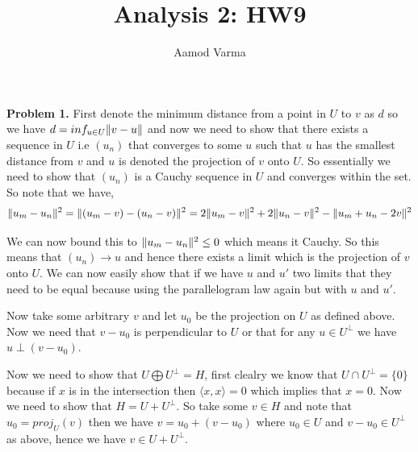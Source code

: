 \documentclass[a4paper]{article}
\title{Analysis 2: HW9}
\author{Aamod Varma}
\DeclarePairedDelimiter{\norm}{\lVert}{\rVert}
\begin{document}
\maketitle
\textbf{Problem 1.}
First denote the minimum distance from a point in $U$ to $v$ as $d$ so we have $d = inf_{u \in U} \norm{v - u}$ and now we need to show that there exists a sequence in $U$ i.e $(u_n)$ that converges to some $u$ such that $u$ has the smallest distance from $v$ and $u$ is denoted the projection of $v$ onto $U$. So essentially we  need to show that $(u_n)$ is a Cauchy sequence in $U$ and converges within the set. So note that we have, 
\[
  \norm{u_m - u_n}^2 = \norm{(u_m - v) - (u_n - v)}^2 = 2 \norm{u_m - v}^2 + 2 \norm{u_n - v}^2 - \norm{u_m + u_n - 2v}^2
\]

We can now bound this to $\norm{u_m - u_n}^2 \le 0$ which means it Cauchy. So this means that $(u_n) \to u$ and hence there exists a limit which is the projection of $v$ onto $U$. We can now easily show that if we have $u$ and $u'$ two limits that they need to be equal because using the parallelogram law again but with $u$ and $u'$.

\vspace{1em}
Now take some arbitrary $v$ and let $u_{0}$ be the projection on $U$ as defined above. Now we need that $v - u_{0}$ is perpendicular to $U$ or that for any $u \in U^{\perp}$ we have $u \perp (v - u_{0})$. 

\vspace{1em}

Now we need to show that $U \bigoplus U^{\perp} = H$, first clealry we know that $U \cap U^{\perp} = \{0\}$ because if $x$ is in the intersection then $\langle x, x \rangle = 0$ which implies that $x = 0$. Now we need to show that $H = U + U^{\perp}$. So take some $v \in H$ and note that $u_{0} = proj_U (v)$ then we have $v = u_{0} + (v - u_{0})$ where $u_{0} \in U$ and $v-u_{0} \in U^{\perp}$ as above, hence we have $v \in U + U^{\perp}$.

\end{document}

